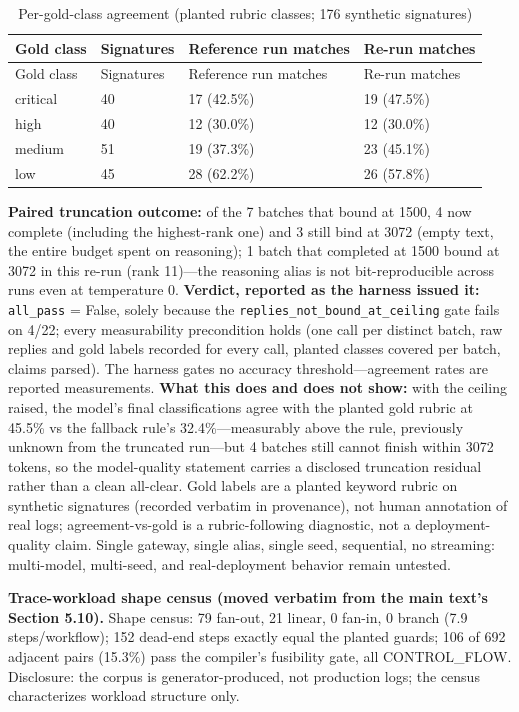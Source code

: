 \documentclass[
  11pt,
]{article}
\begin{document}
\begin{longtable}[]{@{}llll@{}}
\caption{Per-gold-class agreement (planted rubric classes; 176 synthetic
signatures)}\tabularnewline
\toprule\noalign{}
Gold class & Signatures & Reference run matches & Re-run matches \\
\midrule\noalign{}
\endfirsthead
\toprule\noalign{}
Gold class & Signatures & Reference run matches & Re-run matches \\
\midrule\noalign{}
\endhead
\bottomrule\noalign{}
\endlastfoot
critical & 40 & 17 (42.5\%) & 19 (47.5\%) \\
high & 40 & 12 (30.0\%) & 12 (30.0\%) \\
medium & 51 & 19 (37.3\%) & 23 (45.1\%) \\
low & 45 & 28 (62.2\%) & 26 (57.8\%) \\
\end{longtable}

\textbf{Paired truncation outcome:} of the 7 batches that bound at 1500,
4 now complete (including the highest-rank one) and 3 still bind at 3072
(empty text, the entire budget spent on reasoning); 1 batch that
completed at 1500 bound at 3072 in this re-run (rank 11)---the reasoning
alias is not bit-reproducible across runs even at temperature 0.
\textbf{Verdict, reported as the harness issued it:} \texttt{all\_pass}
= False, solely because the \texttt{replies\_not\_bound\_at\_ceiling}
gate fails on 4/22; every measurability precondition holds (one call per
distinct batch, raw replies and gold labels recorded for every call,
planted classes covered per batch, claims parsed). The harness gates no
accuracy threshold---agreement rates are reported measurements.
\textbf{What this does and does not show:} with the ceiling raised, the
model's final classifications agree with the planted gold rubric at
45.5\% vs the fallback rule's 32.4\%---measurably above the rule,
previously unknown from the truncated run---but 4 batches still cannot
finish within 3072 tokens, so the model-quality statement carries a
disclosed truncation residual rather than a clean all-clear. Gold labels
are a planted keyword rubric on synthetic signatures (recorded verbatim
in provenance), not human annotation of real logs; agreement-vs-gold is
a rubric-following diagnostic, not a deployment-quality claim. Single
gateway, single alias, single seed, sequential, no streaming:
multi-model, multi-seed, and real-deployment behavior remain untested.

\textbf{Trace-workload shape census (moved verbatim from the main text's
Section 5.10).} Shape census: 79 fan-out, 21 linear, 0 fan-in, 0 branch
(7.9 steps/workflow); 152 dead-end steps exactly equal the planted
guards; 106 of 692 adjacent pairs (15.3\%) pass the compiler's
fusibility gate, all CONTROL\_FLOW. Disclosure: the corpus is
generator-produced, not production logs; the census characterizes
workload structure only.
\end{document}

